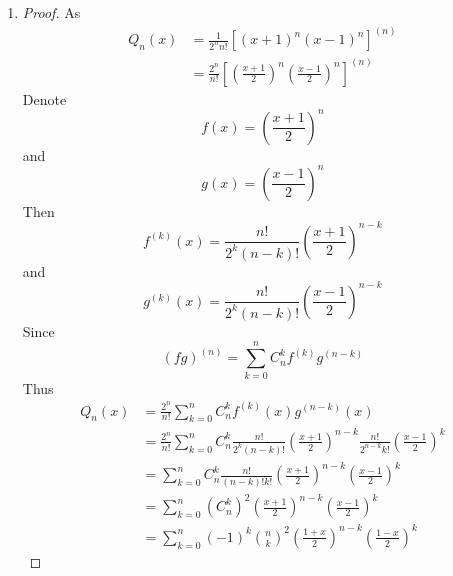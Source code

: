 \documentclass[paper=a4, fontsize=11pt]{scrartcl} %
\numberwithin{equation}{section} %
\numberwithin{figure}{section} %
\numberwithin{table}{section} %
\begin{document}
\begin{enumerate}
		\item
			\begin{proof}
				As 
				\begin{equation}
					\begin{aligned}
						Q_n(x) & = \frac{1}{2^n n!}[(x+1)^n(x-1)^n]^{(n)} \\
							   & = \frac{2^n}{n!}[(\frac{x+1}{2})^n(\frac{x-1}{2})^n]^{(n)}
					\end{aligned}
				\end{equation}
				Denote
				\begin{equation}
					f(x) = (\frac{x+1}{2})^n
				\end{equation}
				and
				\begin{equation}
					g(x) = (\frac{x-1}{2})^n
				\end{equation}
				Then
				\begin{equation}
					f^{(k)}(x) = \frac{n!}{2^k (n-k)!} (\frac{x+1}{2})^{n-k}
				\end{equation}
				and
				\begin{equation}
					g^{(k)}(x) = \frac{n!}{2^k (n-k)!} (\frac{x-1}{2})^{n-k}
				\end{equation}
				Since
				\begin{equation}
					(fg)^{(n)} = \sum_{k=0}^{n} C_n^k f^{(k)}g^{(n-k)}
				\end{equation}
				Thus
				\begin{equation}
					\begin{aligned}
						Q_n(x) & = \frac{2^n}{n!} \sum_{k=0}^{n} C_n^k f^{(k)}(x) g^{(n-k)}(x)\\
							   & = \frac{2^n}{n!} \sum_{k=0}^{n} C_n^k \frac{n!}{2^k (n-k)!} (\frac{x+1}{2})^{n-k} \frac{n!}{2^{n-k} k!} (\frac{x-1}{2})^k \\
							   & = \sum_{k=0}^{n} C_n^k \frac{n!}{(n-k)!k!} (\frac{x+1}{2})^{n-k} (\frac{x-1}{2})^k\\
							   & = \sum_{k=0}^{n} (C_n^k)^2 (\frac{x+1}{2})^{n-k} (\frac{x-1}{2})^k\\
							   &= \sum_{k=0}^{n} (-1)^k \binom{n}{k}^2 (\frac{1+x}{2})^{n-k} (\frac{1-x}{2})^k
					\end{aligned}
				\end{equation}
				
			\end{proof}
	
	\end{enumerate}

\end{document}
